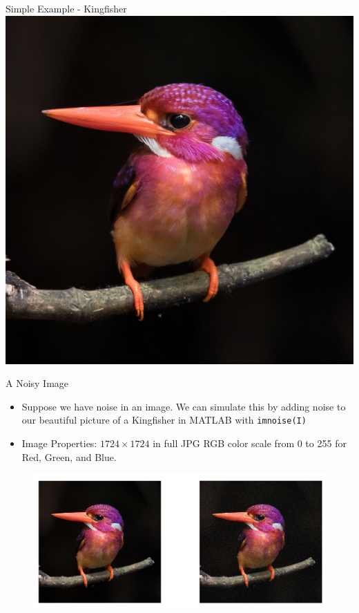 \documentclass[aspectratio=169,xcolor=dvipsnames]{beamer}
\begin{document}
	\begin{frame}{Simple Example - Kingfisher}
		\centering
		\includegraphics[scale=0.5]{Kingfisher.jpg}
	\end{frame}


	\begin{frame}[fragile]{A Noisy Image}
		\begin{itemize}
			\item Suppose we have noise in an image. We can simulate this by adding noise to our beautiful picture of a Kingfisher in MATLAB with \verb*|imnoise(I)|	
			\item Image Properties: $1724\times1724$ in full JPG RGB color scale from 0 to 255 for Red, Green, and Blue.
		\end{itemize}
		\begin{figure}
			\centering
			\includegraphics[scale=0.35]{KingfisherWNoise.png}
		\end{figure}
	\end{frame}
	
\end{document}
